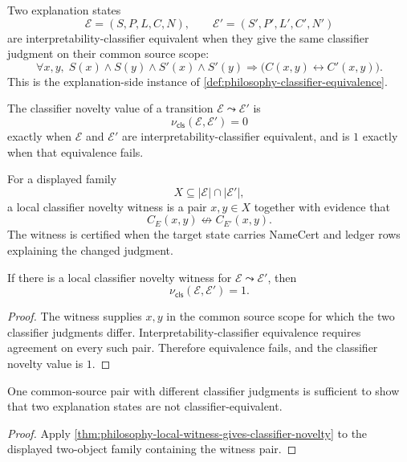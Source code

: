 \begin{definition}
\label{def:philosophy-interpretability-classifier-equivalence}
Two explanation states
$$
\mathcal E=(S,P,L,C,N),
\qquad
\mathcal E'=(S',P',L',C',N')
$$
are interpretability-classifier equivalent when they give the same
classifier judgment on their common source scope:
$$
\forall x,y,\;
S(x)\land S(y)\land S'(x)\land S'(y)
\Rightarrow
\bigl(C(x,y)\leftrightarrow C'(x,y)\bigr).
$$
This is the explanation-side instance of
\autoref{def:philosophy-classifier-equivalence}.
\end{definition}

\begin{definition}
\label{def:philosophy-classifier-novelty-value}
The classifier novelty value of a transition
$\mathcal E\leadsto\mathcal E'$ is
$$
\nu_{\mathsf{cls}}(\mathcal E,\mathcal E')=0
$$
exactly when $\mathcal E$ and $\mathcal E'$ are
interpretability-classifier equivalent, and is $1$ exactly when that
equivalence fails.
\end{definition}

\begin{definition}
\label{def:philosophy-local-classifier-novelty-witness}
For a displayed family
$$
X\subseteq|\mathcal E|\cap|\mathcal E'|,
$$
a local classifier novelty witness is a pair $x,y\in X$ together with
evidence that
$$
C_E(x,y)\not\leftrightarrow C_{E'}(x,y).
$$
The witness is certified when the target state carries NameCert and
ledger rows explaining the changed judgment.
\end{definition}

\begin{theorem}
\label{thm:philosophy-local-witness-gives-classifier-novelty}
If there is a local classifier novelty witness for
$\mathcal E\leadsto\mathcal E'$, then
$$
\nu_{\mathsf{cls}}(\mathcal E,\mathcal E')=1.
$$
\end{theorem}
\begin{proof}
The witness supplies $x,y$ in the common source scope for which the two
classifier judgments differ. Interpretability-classifier equivalence
requires agreement on every such pair. Therefore equivalence fails, and
the classifier novelty value is $1$.
\end{proof}

\begin{corollary}
\label{cor:philosophy-one-pair-certifies-non-equivalence}
One common-source pair with different classifier judgments is sufficient
to show that two explanation states are not classifier-equivalent.
\end{corollary}
\begin{proof}
Apply
\autoref{thm:philosophy-local-witness-gives-classifier-novelty}
to the displayed two-object family containing the witness pair.
\end{proof}

